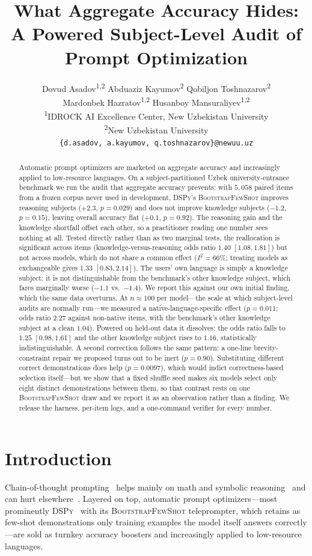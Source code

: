 \documentclass[11pt]{article}
\title{What Aggregate Accuracy Hides:\\
A Powered Subject-Level Audit of Prompt Optimization}
\author{
  Dovud Asadov\textsuperscript{1,2} \quad
  Abduaziz Kayumov\textsuperscript{2} \quad
  Qobiljon Toshnazarov\textsuperscript{2} \\
  Mardonbek Hazratov\textsuperscript{1,2} \quad
  Husanboy Mansuraliyev\textsuperscript{1,2} \\[2pt]
  \textsuperscript{1}IDROCK AI Excellence Center, New Uzbekistan University \\
  \textsuperscript{2}New Uzbekistan University \\
  \texttt{\{d.asadov,\,a.kayumov,\,q.toshnazarov\}@newuu.uz}
}
\newcommand{\bsfs}{\textsc{BootstrapFewShot}}
\begin{document}
\maketitle

\begin{abstract}
Automatic prompt optimizers are marketed on aggregate accuracy and increasingly applied
to low-resource languages. On a subject-partitioned Uzbek university-entrance benchmark
we run the audit that aggregate accuracy prevents: with $5{,}058$ paired items from a
frozen corpus never used in development, \textsc{DSPy}'s \bsfs{} improves reasoning
subjects ($+2.3$, $p{=}0.029$) and does not improve knowledge subjects ($-1.2$,
$p{=}0.15$), leaving overall accuracy flat ($+0.1$, $p{=}0.92$). The reasoning gain and
the knowledge shortfall offset each other, so a practitioner reading one number sees
nothing at all. Tested directly rather than as two marginal tests, the reallocation is
significant across items (knowledge-versus-reasoning odds ratio $1.40$ $[1.08, 1.81]$)
but not across models, which do not share a common effect ($I^2{=}66\%$; treating models
as exchangeable gives $1.33$ $[0.83, 2.14]$).
The users' own language is simply a knowledge subject: it is not distinguishable from
the benchmark's other knowledge subject, which fares marginally worse ($-1.1$ vs.\
$-1.4$). We report this against our own initial finding, which the same data overturns.
At $n{\approx}100$ per model---the scale at which subject-level audits are normally
run---we measured a native-language-specific effect ($p{=}0.011$; odds ratio $2.27$
against non-native items, with the benchmark's other knowledge subject at a clean
$1.04$). Powered on held-out data it dissolves: the odds ratio falls to $1.25$
$[0.98, 1.61]$ and the other knowledge subject rises to $1.16$, statistically
indistinguishable. A second correction follows the same pattern: a one-line
brevity-constraint repair we proposed turns out to be inert ($p{=}0.90$). Substituting
different correct demonstrations does help ($p{=}0.0097$), which would indict
correctness-based selection itself---but we show that a fixed shuffle seed makes six
models select only eight distinct demonstrations between them, so that contrast rests on
one \bsfs{} draw and we report it as an observation rather than a finding. We release the
harness, per-item logs, and a one-command verifier for every number.
\end{abstract}

\section{Introduction}
Chain-of-thought prompting~\citep{wei2022cot} helps mainly on math and symbolic
reasoning~\citep{sprague2025cot} and can hurt elsewhere~\citep{liu2025mind}. Layered on
top, automatic prompt optimizers---most prominently \textsc{DSPy}~\citep{khattab2024dspy}
with its \bsfs{} teleprompter, which retains as few-shot demonstrations only training
examples the model itself answers correctly---are sold as turnkey accuracy boosters and
increasingly applied to low-resource languages.
\end{document}
